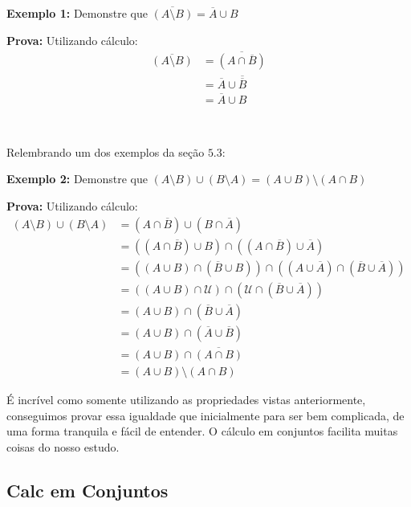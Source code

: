 \textbf{Exemplo 1:} Demonstre que $\overline{(A \setminus B)} = \overline A \cup B$

\textbf{Prova:} Utilizando cálculo:
\begin{equation*}
\begin{aligned}
  \overline{(A \setminus B)} &= \overline{(A \cap \overline B)}\\
  &= \overline A \cup \overline{\overline B}\\
  & = \overline A \cup B
\end{aligned}
\end{equation*}

$\qquad$

Relembrando um dos exemplos da seção $5.3$:

\textbf{Exemplo 2:} Demonstre que $(A \setminus B) \cup (B \setminus A) = (A \cup B) \setminus (A \cap B)$

\textbf{Prova:} Utilizando cálculo:
\begin{equation*}
\begin{aligned}
  (A \setminus B) \cup (B \setminus A) &= (A \cap \overline B) \cup (B \cap \overline A)\\
  &= ((A \cap \overline B) \cup B) \cap ((A \cap \overline B) \cup \overline A)\\
  &= ((A \cup B) \cap (\overline B \cup B)) \cap ((A \cup \overline A) \cap (\overline B \cup \overline A))\\
  &= ((A \cup B) \cap \mathcal U) \cap (\mathcal U \cap (\overline B \cup \overline A))\\
  &= (A \cup B) \cap (\overline B \cup \overline A)\\
  &= (A \cup B) \cap (\overline A \cup \overline B)\\
  &= (A \cup B) \cap \overline{(A \cap B)}\\
  &= (A \cup B) \setminus (A \cap B)
\end{aligned}
\end{equation*}

É incrível como somente utilizando as propriedades vistas anteriormente, conseguimos provar essa igualdade que inicialmente para ser bem complicada, de uma forma tranquila e fácil de entender. O cálculo em conjuntos facilita muitas coisas do nosso estudo.

\subsection{Calc em Conjuntos}

